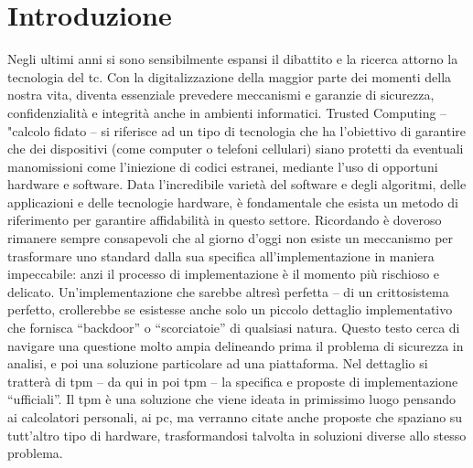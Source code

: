 \chapter*{Introduzione}\label{ch:introduzione}

Negli ultimi anni si sono sensibilmente espansi il dibattito e la ricerca attorno la tecnologia del \acrfull{tc}.
Con la digitalizzazione della maggior parte dei momenti della nostra vita, diventa essenziale prevedere meccanismi e garanzie di sicurezza, confidenzialità e integrità anche in ambienti informatici.
Trusted Computing -- "calcolo fidato -- si riferisce ad un tipo di tecnologia che ha l’obiettivo di garantire che dei dispositivi (come computer o telefoni cellulari) siano protetti da eventuali manomissioni come l’iniezione di codici estranei, mediante l’uso di opportuni hardware e software.
Data l’incredibile varietà del software e degli algoritmi, delle applicazioni e delle tecnologie hardware, è fondamentale che esista un metodo di riferimento per garantire affidabilità in questo settore. Ricordando è doveroso rimanere sempre consapevoli che al giorno d’oggi non esiste un meccanismo per trasformare uno standard dalla sua specifica all’implementazione in maniera impeccabile: anzi il processo di implementazione è il momento più rischioso e delicato. Un’implementazione che sarebbe altresì perfetta -- di un crittosistema perfetto, crollerebbe se esistesse anche solo un piccolo dettaglio implementativo che fornisca \enquote{backdoor} o \enquote{scorciatoie} di qualsiasi natura.  
Questo testo cerca di navigare una questione molto ampia delineando prima il problema di sicurezza in analisi, e poi una soluzione particolare ad una piattaforma. Nel dettaglio si tratterà di \acrfull{tpm} -- da qui in poi \acrshort{tpm} -- la specifica e proposte di implementazione “ufficiali”. 
Il \acrshort{tpm} è una soluzione che viene ideata in primissimo luogo pensando ai calcolatori personali, ai \acrfull{pc}, ma verranno citate anche proposte che spaziano su tutt’altro tipo di hardware, trasformandosi talvolta in soluzioni diverse allo stesso problema.
